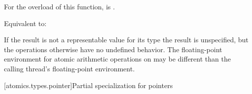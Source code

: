 \begin{itemdescr}
\pnum
\constraints
For the  overload of this function,
 is .

\pnum
\effects
Equivalent to: 

\pnum
\remarks
If the result is not a representable value for its type
the result is unspecified, but the operations otherwise have no undefined
behavior.
The floating-point environment for atomic arithmetic operations
on  may be different than the
calling thread's floating-point environment.
\end{itemdescr}

[atomics.types.pointer]{Partial specialization for pointers}
%

